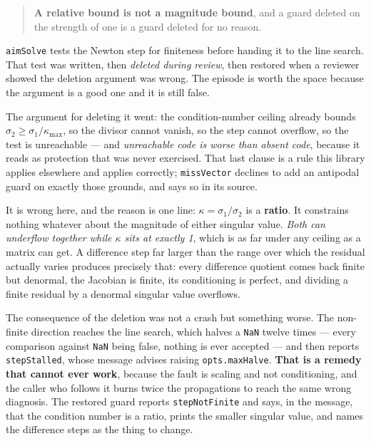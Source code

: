 \documentclass[11pt]{article}
\newcommand{\code}[1]{\texttt{#1}}
\begin{document}
\begin{quote}
\textbf{A relative bound is not a magnitude bound}, and a guard deleted on the
strength of one is a guard deleted for no reason.
\end{quote}

\code{aimSolve} tests the Newton step for finiteness before handing it to the
line search. That test was written, then \emph{deleted during review}, then
restored when a reviewer showed the deletion argument was wrong. The episode is
worth the space because the argument is a good one and it is still false.

The argument for deleting it went: the condition-number ceiling already bounds
$\sigma_2 \geq \sigma_1/\kappa_{\max}$, so the divisor cannot vanish, so the
step cannot overflow, so the test is unreachable --- and \emph{unreachable code
is worse than absent code}, because it reads as protection that was never
exercised. That last clause is a rule this library applies elsewhere and
applies correctly; \code{missVector} declines to add an antipodal guard on
exactly those grounds, and says so in its source.

It is wrong here, and the reason is one line:
$\kappa = \sigma_1/\sigma_2$ is a \textbf{ratio}. It constrains nothing
whatever about the magnitude of either singular value. \emph{Both can underflow
together while $\kappa$ sits at exactly 1}, which is as far under any ceiling
as a matrix can get. A difference step far larger than the range over which the
residual actually varies produces precisely that: every difference quotient
comes back finite but denormal, the Jacobian is finite, its conditioning is
perfect, and dividing a finite residual by a denormal singular value overflows.

The consequence of the deletion was not a crash but something worse. The
non-finite direction reaches the line search, which halves a \code{NaN} twelve
times --- every comparison against \code{NaN} being false, nothing is ever
accepted --- and then reports \code{stepStalled}, whose message advises raising
\code{opts.maxHalve}. \textbf{That is a remedy that cannot ever work}, because
the fault is scaling and not conditioning, and the caller who follows it burns
twice the propagations to reach the same wrong diagnosis. The restored guard
reports \code{stepNotFinite} and says, in the message, that the condition
number is a ratio, prints the smaller singular value, and names the difference
steps as the thing to change.
\end{document}
